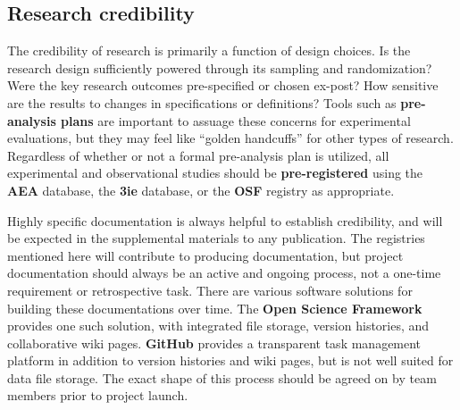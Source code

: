 \subsection{Research credibility}

The credibility of research is primarily a function of design choices.\cite{angrist2010credibility,ioannidis2005most}
Is the research design sufficiently powered through its sampling and randomization?
Were the key research outcomes pre-specified or chosen ex-post?
How sensitive are the results to changes in specifications or definitions?
Tools such as \textbf{pre-analysis plans}
are important to assuage these concerns for experimental evaluations,
but they may feel like ``golden handcuffs'' for other types of research.\cite{olken2015promises}
Regardless of whether or not a formal pre-analysis plan is utilized,
all experimental and observational studies should be \textbf{pre-registered}
using the \textbf{AEA} database,
the \textbf{3ie} database,
or the \textbf{OSF} registry as appropriate.

Highly specific documentation is always helpful to establish credibility,
and will be expected in the supplemental materials to any publication.
The registries mentioned here will contribute to producing documentation,
but project documentation should always be an active and ongoing process,
not a one-time requirement or retrospective task.
There are various software solutions for building these documentations over time.
The \textbf{Open Science Framework} provides one such solution,
with integrated file storage, version histories, and collaborative wiki pages.
\textbf{GitHub} provides a transparent task management
platform
in addition to version histories and wiki pages, but is not well suited for data file storage.
The exact shape of this process should be agreed on by team members prior to project launch.

